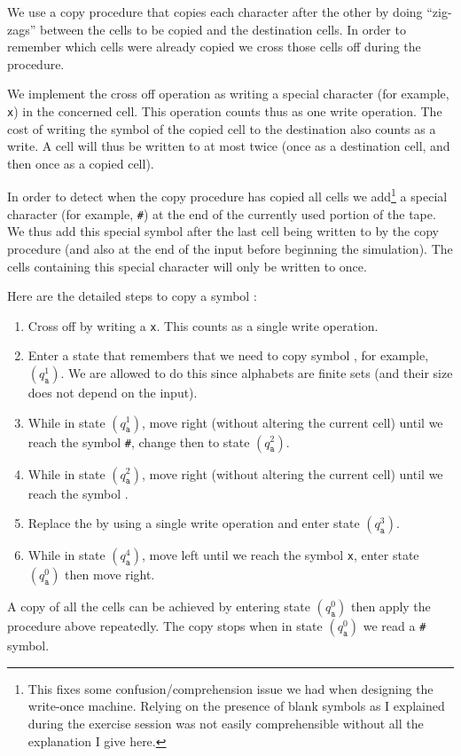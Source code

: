 \documentclass{article}
\newcommand\obullet[1]{\ThisStyle{\ensurestackMath{%
  \stackon[1pt]{\SavedStyle#1}{\SavedStyle\kern.6\LMpt\bullet}}}}
\newcommand{\blank}{\texttt{\textvisiblespace}}
\newcommand{\s}{\texttt{a}}
\newcommand{\x}{\texttt{x}}
\newcommand{\e}{\texttt{\#}}
\begin{document}
We use a copy procedure that copies each character after
the other by doing ``zig-zags'' between the cells to be copied and the destination
cells. In order to remember which cells were already copied we cross those
cells off during the procedure.

We implement the cross off operation as
writing a special character (for example, \x) in the concerned cell.
This operation counts thus as one write operation. The cost of writing the
symbol of the copied cell to the destination also counts as a write. A cell
will thus be written to at most twice (once as a destination cell, and then
once as a copied cell).

In order to detect when the copy procedure has copied all cells
we add\footnote{%
This fixes some confusion/comprehension issue we had when designing the
write-once machine. Relying on the presence of blank symbols as I explained
during the exercise session was not easily comprehensible without all the
explanation I give here.}
a
special character (for example, \e)
at the end of the currently used portion of the tape.
We thus add this special symbol after the last cell being written to by the
copy procedure (and also at the end of the input before beginning the
simulation). The cells containing this special character will only be written to once.

Here are the detailed steps to copy a symbol \obullet{\s}:
\begin{enumerate}
	\item Cross off \obullet{\s} by writing a \x. This
		counts as a single write operation.
	\item Enter a state that remembers that we need to copy symbol
		\obullet{\s}, for example, \((q_{\texttt{a}}^1)\). We are allowed
		to do this since alphabets are finite sets (and their size does not
		depend on the input).
	\item While in state \((q_{\texttt{a}}^1)\), move right (without
		altering the current cell) until we reach
		the symbol \e, change then to state
		\((q_{\texttt{a}}^2)\).
	\item While in state \((q_{\texttt{a}}^2)\), move right (without
	altering the current cell) until we reach the symbol \blank{}.
\item Replace the \blank{} by \obullet{\s} using a
		single write operation and enter state \((q_{\texttt{a}}^3)\).
	\item While in state \((q_{\texttt{a}}^4)\), move left until we reach
		the symbol \x, enter state \((q_{\texttt{a}}^0)\)
		then move right.
\end{enumerate}
A copy of all the cells can be achieved by entering state \((q_{\texttt{a}}^0)\)
then apply the procedure above repeatedly.
The copy stops when in state \((q_{\texttt{a}}^0)\) we read a \e{}
symbol.
\end{document}
